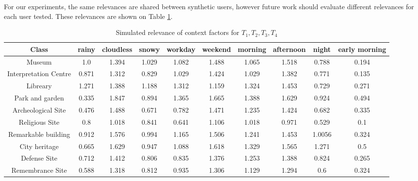 For our experiments, the same relevances are shared between synthetic users, however future work should evaluate different relevances for each user tested. These relevances are shown on Table \ref{table:relevances-experiment}.

\begin{table}[h!]
\centering
\caption{Simulated relevance of context factors for $T_1, T_2, T_3, T_4$
}
\label{table:relevances-experiment}
\begin{tabular}{ |c|c|c|c|c|c|c|c|c|c| } 
    \hline
    \textbf{Class} & \textbf{rainy} & \textbf{cloudless} & \textbf{snowy} & \textbf{workday} & \textbf{weekend} & \textbf{morning} & \textbf{afternoon} & \textbf{night} & \textbf{early morning} \\
    \hline
    \hline

    Museum & 1.0 & 1.394 & 1.029 & 1.082 & 1.488 & 1.065 & 1.518 & 0.788 & 0.194 \\ \hline
    
    Interpretation Centre & 0.871 & 1.312 & 0.829 & 1.029 & 1.424 & 1.029  & 1.382 & 0.771 & 0.135 \\ \hline

    Libreary & 1.271 & 1.388  & 1.188  & 1.312 &1.159 & 1.324 & 1.453 & 0.729  & 0.271 \\ \hline

    Park and garden &
    0.335 & 1.847  & 0.894 & 1.365 & 1.665 & 1.388  & 1.629 & 0.924 & 0.494  \\ \hline

    Archeological Site &
    0.476 & 1.488 & 0.671 & 0.782 & 1.471 & 1.235 & 1.424 & 0.682  & 0.335 \\ \hline

    Religious Site &
    0.8 & 1.018 & 0.841  & 0.641  & 1.106 & 1.018 & 0.971 & 0.529  & 0.1 \\ \hline

    Remarkable building &
    0.912 & 1.576  & 0.994  & 1.165 & 1.506 & 1.241  & 1.453 & 1.0056 & 0.324 \\ \hline
    
    City heritage &
    0.665 & 1.629  & 0.947  & 1.088  & 1.618 & 1.329  & 1.565 & 1.271 & 0.5 \\ \hline
    
    Defense Site &
    0.712 & 1.412 & 0.806 & 0.835  & 1.376  & 1.253 & 1.388  & 0.824 & 0.265 \\ \hline
    
    Remembrance Site &
    0.588  & 1.318 & 0.812 & 0.935  & 1.306 & 1.129  & 1.294  & 0.6 & 0.324 \\ \hline
    

\end{tabular}
\end{table}
